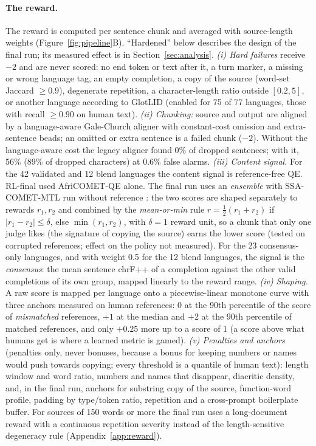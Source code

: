 \paragraph{The reward.} The reward is computed per sentence chunk and averaged with source-length weights (Figure~\ref{fig:pipeline}B). ``Hardened'' below describes the design of the final run; its measured effect is in Section~\ref{sec:analysis}.
\emph{(i) Hard failures} receive $-2$ and are never scored: no end token or text after it, a turn marker, a missing or wrong language tag, an empty completion, a copy of the source (word-set Jaccard $\ge0.9$), degenerate repetition, a character-length ratio outside $[0.2,5]$, or another language according to GlotLID \citep{kargaran2023glotlid} (enabled for 75 of 77 languages, those with recall $\ge0.90$ on human text).
\emph{(ii) Chunking:} source and output are aligned by a language-aware Gale-Church aligner \citep{gale1993program} with constant-cost omission and extra-sentence beads; an omitted or extra sentence is a failed chunk ($-2$). Without the language-aware cost the legacy aligner found 0\% of dropped sentences; with it, 56\% (89\% of dropped characters) at 0.6\% false alarms.
\emph{(iii) Content signal.} For the 42 validated and 12 blend languages the content signal is reference-free QE. RL-final used AfriCOMET-QE alone. The final run uses an \emph{ensemble} with SSA-COMET-MTL run without reference \citep{li2025ssacomet}: the two scores are shaped separately to rewards $r_1,r_2$ and combined by the \emph{mean-or-min} rule
$r=\tfrac12(r_1+r_2)$ if $|r_1-r_2|\le\delta$, else $\min(r_1,r_2)$, with $\delta=1$ reward unit, so a chunk that only one judge likes (the signature of copying the source) earns the lower score (tested on corrupted references; effect on the policy not measured). For the 23 consensus-only languages, and with weight 0.5 for the 12 blend languages, the signal is the \emph{consensus}: the mean sentence chrF++ of a completion against the other valid completions of its own group, mapped linearly to the reward range.
\emph{(iv) Shaping.} A raw score is mapped per language onto a piecewise-linear monotone curve with three anchors measured on human references: 0 at the 90th percentile of the score of \emph{mismatched} references, $+1$ at the median and $+2$ at the 90th percentile of matched references, and only $+0.25$ more up to a score of 1 (a score above what humans get is where a learned metric is gamed).
\emph{(v) Penalties and anchors} (penalties only, never bonuses, because a bonus for keeping numbers or names would push towards copying; every threshold is a quantile of human text): length window and word ratio, numbers and names that disappear, diacritic density, and, in the final run, anchors for substring copy of the source, function-word profile, padding by type/token ratio, repetition and a cross-prompt boilerplate buffer. For sources of 150 words or more the final run uses a long-document reward with a continuous repetition severity instead of the length-sensitive degeneracy rule (Appendix~\ref{app:reward}).


